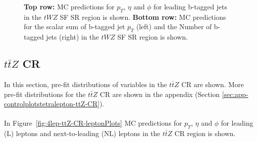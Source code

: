 \begin{figure}[htbp]
    \caption{\textbf{Top row:} MC predictions for $p_{T}$, $\eta$ and $\phi$ for leading b-tagged jets in the $tWZ$ SF SR region  is shown. \textbf{Bottom row:} MC predictions for the scalar sum of b-tagged jet $p_{T}$ (left) and the Number of b-tagged jets (right) in the $tWZ$ SF SR region  is shown.}
  \label{fig:4lep-SF-SR-bjetPlots}
\end{figure}

\subsection{$t\bar{t}Z$ CR}
\label{sec:controlplotstetralepton-ttZ-CR}


In this section, pre-fit distributions of variables in the $t\bar{t}Z$ CR are shown. More pre-fit distributions for the $t\bar{t}Z$ CR are shown in the appendix (Section \ref{sec:app-controlplotstetralepton-ttZ-CR}).\\\\

In Figure~\ref{fig:4lep-ttZ-CR-leptonPlots} MC predictions for $p_{T}$, $\eta$ and $\phi$ for leading (L) leptons and next-to-leading (NL) leptons in the $t\bar{t}Z$ CR region is shown.

